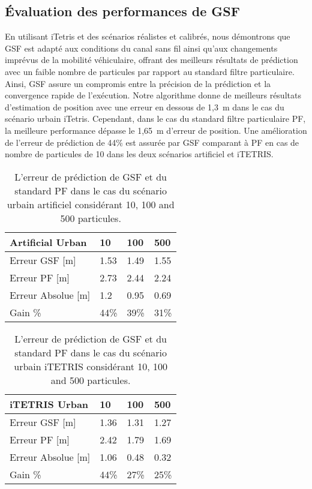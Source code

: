 \subsection{Évaluation des performances de GSF}
En utilisant iTetris \cite{itetris} et des scénarios réalistes et calibrés, nous démontrons que GSF est adapté aux conditions du canal sans fil ainsi qu'aux changements imprévus de la mobilité véhiculaire, offrant des meilleurs résultats de prédiction avec un faible nombre de particules par rapport au standard filtre particulaire. Ainsi, GSF assure un compromis entre la précision de la prédiction et la convergence rapide de l'exécution.
Notre algorithme donne de meilleurs résultats d'estimation de position avec une erreur en dessous de 1,3~m dans le cas du scénario urbain iTetris. Cependant, dans le cas du standard filtre particulaire PF, la meilleure performance dépasse le 1,65~m d'erreur de position. Une amélioration de l'erreur de prédiction de 44\% est assurée par GSF comparant à PF en cas de nombre de particules de 10 dans les deux scénarios artificiel et iTETRIS.

\begin{table}
	\centering
	\begin{tabular}{llll}
		\toprule
\textbf{Artificial Urban} & \textbf{10} & \textbf{100} & \textbf{500}\\
\midrule 
Erreur GSF [m] & 1.53 & 1.49 & 1.55\\
\midrule 
Erreur PF [m] & 2.73 & 2.44 & 2.24\\
\midrule
Erreur Absolue [m] & 1.2 & 0.95 & 0.69 \\
\midrule
Gain \% & 44\% & 39\% & 31\% \\ 
		\bottomrule
	\end{tabular}
	\caption{L'erreur de prédiction de GSF et du standard PF dans le cas du scénario urbain artificiel considérant 10, 100 and 500 particules.}
	\label{tab:artificialurban}
\end{table}


\begin{table}
	\centering
	\begin{tabular}{llll}
		\toprule
\textbf{iTETRIS Urban} & \textbf{10} & \textbf{100} & \textbf{500}\\
\midrule 
Erreur GSF [m] & 1.36 & 1.31 & 1.27\\
\midrule 
Erreur PF [m] & 2.42 & 1.79 & 1.69\\
\midrule
Erreur Absolue [m] & 1.06 & 0.48 & 0.32 \\
\midrule
Gain \% & 44\% & 27\% & 25\% \\ 
		\bottomrule
	\end{tabular}
	\caption{L'erreur de prédiction de GSF et du standard PF dans le cas du scénario urbain iTETRIS considérant 10, 100 and 500 particules.}
	\label{tab:itetrisurban}
\end{table}


